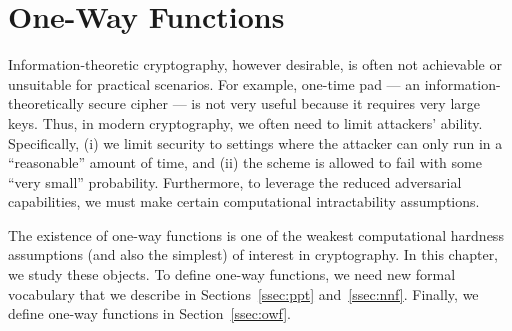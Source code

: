 
\chapter{One-Way Functions}
\label{sec:owf}

Information-theoretic cryptography, however desirable, is often not achievable or unsuitable for practical scenarios. For example, one-time pad --- an information-theoretically secure cipher --- is not very useful because it requires very large keys. Thus, in modern cryptography, we often need to limit attackers' ability. Specifically, (i) we limit security to settings where the attacker can only run in a ``reasonable'' amount of time, and (ii) the scheme is allowed to fail with some ``very small'' probability. Furthermore, to leverage the reduced adversarial capabilities, we must make certain computational intractability assumptions.

The existence of one-way functions is one of the weakest computational hardness assumptions (and also the simplest) of interest in cryptography. In this chapter, we study these objects.
To define one-way functions, we need new formal vocabulary that we describe in Sections~\ref{ssec:ppt} and~\ref{ssec:nnf}. Finally, we define one-way functions in Section~\ref{ssec:owf}.

